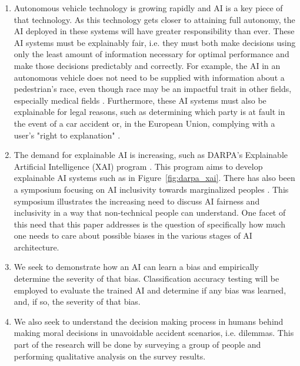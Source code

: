 \documentclass{report}
\begin{document}
\begin{enumerate}
    \item Autonomous vehicle technology is growing rapidly and AI is a key piece of that technology.
    As this technology gets closer to attaining full autonomy, the AI deployed in these systems will
    have greater responsibility than ever. These AI systems must be explainably fair, i.e. they must
    both make decisions using only the least amount of information necessary for optimal performance
    and make those decisions predictably and correctly. For example, the AI in an autonomous vehicle
    does not need to be supplied with information about a pedestrian's race, even though race may be
    an impactful trait in other fields, especially medical fields \cite{sickeCellDisease}.
    Furthermore, these AI systems must also be explainable for legal reasons, such as determining
    which party is at fault in the event of a car accident or, in the European Union, complying with
    a user's "right to explanation" \cite{goodman2017european}.
    
    \item The demand for explainable AI is increasing, such as DARPA's Explainable Artificial
    Intelligence (XAI) program \cite{gunning2016explainable}. This program aims to develop
    explainable AI systems such as in Figure~\ref{fig:darpa_xai}. There has also been a symposium
    focusing on AI inclusivity towards marginalized peoples \cite{berkmanKleinCenterAI2017}
    \cite{aiAndInclusionSymposium}. This symposium illustrates the increasing need to discuss AI
    fairness and inclusivity in a way that non-technical people can understand. One facet of this
    need that this paper addresses is the question of specifically how much one needs to care about
    possible biases in the various stages of AI architecture.
    
    \item We seek to demonstrate how an AI can learn a bias and empirically determine the severity
    of that bias. Classification accuracy testing will be employed to evaluate the trained AI and
    determine if any bias was learned, and, if so, the severity of that bias.

    \item We also seek to understand the decision making process in humans behind making moral
    decisions in unavoidable accident scenarios, i.e. dilemmas. This part of the research will be
    done by surveying a group of people and performing qualitative analysis on the survey results.
\end{enumerate}
\end{document}
